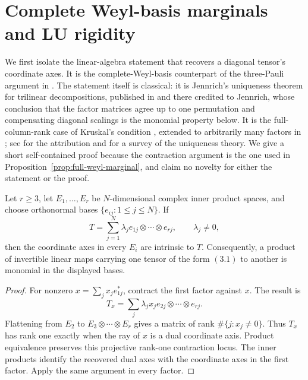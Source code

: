 \section{Complete Weyl-basis marginals and LU rigidity}\label{sec:rigidity}

We first isolate the linear-algebra statement that recovers a diagonal
tensor's coordinate axes.  It is the complete-Weyl-basis counterpart of the
three-Pauli argument in \cite{Rains1999,VanDenNestDehaeneDeMoor2005}.
The statement itself is classical: it is Jennrich's uniqueness theorem for
trilinear decompositions, published in \cite[\S V]{Harshman1970} and there
credited to Jennrich, whose conclusion that the factor matrices agree up to
one permutation and compensating diagonal scalings is the monomial property
below.  It is the full-column-rank case of Kruskal's condition
\cite{Kruskal1977}, extended to arbitrarily many factors in
\cite{SidiropoulosBro2000}; see \cite[\S3.2]{KoldaBader2009} for the
attribution and for a survey of the uniqueness theory.  We give a short
self-contained proof because the contraction argument is the one used in
Proposition~\ref{prop:full-weyl-marginal}, and claim no novelty for either
the statement or the proof.

\begin{lemma}\label{lem:diagonal-axes}
Let \(r\geq3\), let \(E_1,\ldots,E_r\) be \(N\)-dimensional complex inner
product spaces, and choose orthonormal bases
\(\{e_{ij}:1\leq j\leq N\}\).  If
\[
 T=\sum_{j=1}^N\lambda_j
 e_{1j}\otimes\cdots\otimes e_{rj},\qquad \lambda_j\ne0,       \tag{3.1}
\]
then the coordinate axes in every \(E_i\) are intrinsic to \(T\).
Consequently, a product of invertible linear maps carrying one tensor of
the form \((3.1)\) to another is monomial in the displayed bases.
\end{lemma}

\begin{proof}
For nonzero \(x=\sum_jx_je_{1j}^*\), contract the first factor against
\(x\).  The result is
\[
 T_x=\sum_j\lambda_jx_j e_{2j}\otimes\cdots\otimes e_{rj}.
\]
Flattening from \(E_2\) to \(E_3\otimes\cdots\otimes E_r\) gives a matrix
of rank \(\#\{j:x_j\ne0\}\).  Thus \(T_x\) has rank one exactly when
the ray of \(x\) is a dual coordinate axis.  Product equivalence preserves
this projective rank-one contraction locus.  The inner products identify
the recovered dual axes with the coordinate axes in the first factor.
Apply the same argument in every factor.
\end{proof}


